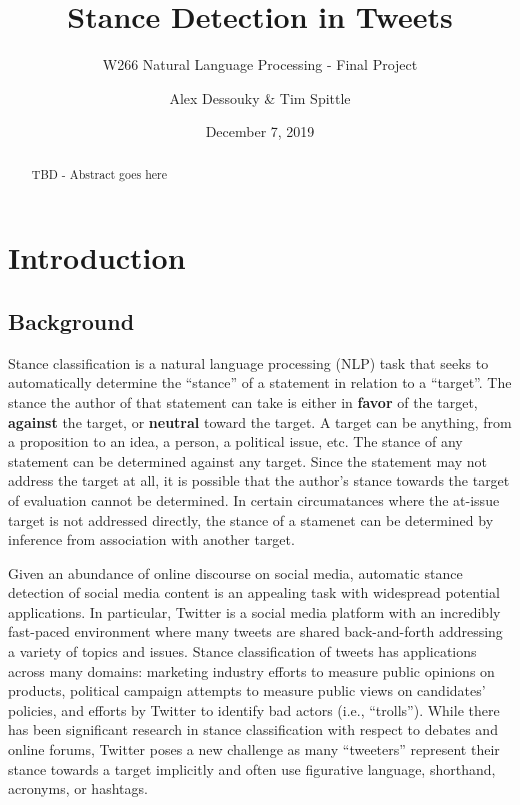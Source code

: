 \documentclass[]{article}
\title{Stance Detection in Tweets}
\subtitle{W266 Natural Language Processing - Final Project}
\author{Alex Dessouky \& Tim Spittle}
\date{December 7, 2019}
\begin{document}
\maketitle
\begin{abstract}
TBD - Abstract goes here
\end{abstract}

\hypertarget{introduction}{%
\section{Introduction}\label{introduction}}

\hypertarget{background}{%
\subsection{Background}\label{background}}

Stance classification is a natural language processing (NLP) task that
seeks to automatically determine the ``stance'' of a statement in
relation to a ``target''. The stance the author of that statement can
take is either in \textbf{favor} of the target, \textbf{against} the
target, or \textbf{neutral} toward the target. A target can be anything,
from a proposition to an idea, a person, a political issue, etc. The
stance of any statement can be determined against any target. Since the
statement may not address the target at all, it is possible that the
author's stance towards the target of evaluation cannot be determined.
In certain circumatances where the at-issue target is not addressed
directly, the stance of a stamenet can be determined by inference from
association with another target.

Given an abundance of online discourse on social media, automatic stance
detection of social media content is an appealing task with widespread
potential applications. In particular, Twitter is a social media
platform with an incredibly fast-paced environment where many tweets are
shared back-and-forth addressing a variety of topics and issues. Stance
classification of tweets has applications across many domains: marketing
industry efforts to measure public opinions on products, political
campaign attempts to measure public views on candidates' policies, and
efforts by Twitter to identify bad actors (i.e., ``trolls''). While
there has been significant research in stance classification with
respect to debates and online forums, Twitter poses a new challenge as
many ``tweeters'' represent their stance towards a target implicitly and
often use figurative language, shorthand, acronyms, or hashtags.
\end{document}
